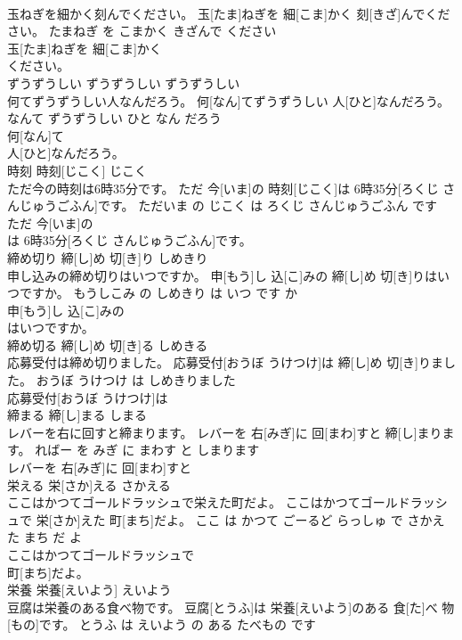 \documentclass[8pt]{extreport}
\begin{document}
\begin{CJK}{UTF8}{min}
\\	玉ねぎを細かく刻んでください。	玉[たま]ねぎを 細[こま]かく 刻[きざ]んでください。	たまねぎ を こまかく きざんで ください	
\\	玉[たま]ねぎを 細[こま]かく
\\	ください。			
\\	ずうずうしい	ずうずうしい	ずうずうしい	
\\	何てずうずうしい人なんだろう。	何[なん]てずうずうしい 人[ひと]なんだろう。	なんて ずうずうしい ひと なん だろう	
\\	何[なん]て
\\	人[ひと]なんだろう。			
\\	時刻	時刻[じこく]	じこく	
\\	ただ今の時刻は6時35分です。	ただ 今[いま]の 時刻[じこく]は 6時35分[ろくじ さんじゅうごふん]です。	ただいま の じこく は ろくじ さんじゅうごふん です	
\\	ただ 今[いま]の
\\	は 6時35分[ろくじ さんじゅうごふん]です。			
\\	締め切り	締[し]め 切[き]り	しめきり	
\\	申し込みの締め切りはいつですか。	申[もう]し 込[こ]みの 締[し]め 切[き]りはいつですか。	もうしこみ の しめきり は いつ です か	
\\	申[もう]し 込[こ]みの
\\	はいつですか。			
\\	締め切る	締[し]め 切[き]る	しめきる	
\\	応募受付は締め切りました。	応募受付[おうぼ うけつけ]は 締[し]め 切[き]りました。	おうぼ うけつけ は しめきりました	
\\	応募受付[おうぼ うけつけ]は
\\	締まる	締[し]まる	しまる	
\\	レバーを右に回すと締まります。	レバーを 右[みぎ]に 回[まわ]すと 締[し]まります。	ればー を みぎ に まわす と しまります	
\\	レバーを 右[みぎ]に 回[まわ]すと
\\	栄える	栄[さか]える	さかえる	
\\	ここはかつてゴールドラッシュで栄えた町だよ。	ここはかつてゴールドラッシュで 栄[さか]えた 町[まち]だよ。	ここ は かつて ごーるど らっしゅ で さかえた まち だ よ	
\\	ここはかつてゴールドラッシュで
\\	町[まち]だよ。			
\\	栄養	栄養[えいよう]	えいよう	
\\	豆腐は栄養のある食べ物です。	豆腐[とうふ]は 栄養[えいよう]のある 食[た]べ 物[もの]です。	とうふ は えいよう の ある たべもの です	

\end{CJK}
\end{document}
